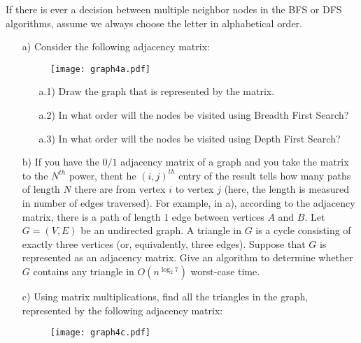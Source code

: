 \documentclass{article}
\begin{document}
\begin{problem}

If there is ever a decision between multiple neighbor nodes in the BFS or DFS algorithms, assume we always choose the letter in alphabetical order.


\begin{itemize}
	\item[a)]{} Consider the following adjacency matrix:
		\begin{figure}[h!]
			\centering
			\texttt{[image: graph4a.pdf]}
		\end{figure}
		
		\begin{itemize}
			\item[a.1)]{} Draw the graph that is represented by the matrix.
			\item[a.2)]{} In what order will the nodes be visited using Breadth First Search?
			\item[a.3)]{} In what order will the nodes be visited using Depth First Search?
		\end{itemize}
	\item[b)]{} If you have the $0/1$ adjacency matrix of a graph and you take the matrix to the $N^{th}$ power, thent he $(i,j)^{th}$ entry of the result tells how many paths of length $N$ there are from vertex $i$ to vertex $j$ (here, the length is measured in number of edges traversed).  For example, in a), according to the adjacency matrix, there is a path of length $1$ edge between vertices $A$ and $B$.
		\vskip 0.15in
		Let $G = (V,E)$ be an undirected graph.  A triangle in $G$ is a cycle consisting of exactly three vertices (or, equivalently, three edges).  Suppose that $G$ is represented as an adjacency matrix.  Give an algorithm to determine whether $G$ contains any triangle in $O(n^{\log_2{7}})$ worst-case time.
	\item[c)]{} Using matrix multiplications, find all the triangles in the graph, represented by the following adjacency matrix:
		\begin{figure}[h!]
			\centering
			\texttt{[image: graph4c.pdf]}
		\end{figure}
\end{itemize}
\end{problem}
\end{document}
